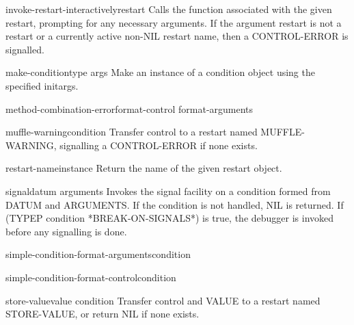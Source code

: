 \documentclass[10pt,english]{book}
\begin{document}
\begin{function}{invoke-restart-interactively}{restart}
  Calls the function associated with the given restart, prompting for any
   necessary arguments. If the argument restart is not a restart or a
   currently active non-NIL restart name, then a CONTROL-ERROR is signalled.
\end{function}

\begin{function}{make-condition}{type \rest args}
  Make an instance of a condition object using the specified initargs.
\end{function}

\begin{function}{method-combination-error}{format-control \rest format-arguments}
  
\end{function}

\begin{function}{muffle-warning}{\op condition}
  Transfer control to a restart named MUFFLE-WARNING, signalling a
   CONTROL-ERROR if none exists.
\end{function}

\begin{function}{restart-name}{instance}
  Return the name of the given restart object.
\end{function}

\begin{function}{signal}{datum \rest arguments}
  Invokes the signal facility on a condition formed from DATUM and
   ARGUMENTS. If the condition is not handled, NIL is returned. If
   (TYPEP condition *BREAK-ON-SIGNALS*) is true, the debugger is invoked
   before any signalling is done.
\end{function}

\begin{function}{simple-condition-format-arguments}{condition}
  
\end{function}

\begin{function}{simple-condition-format-control}{condition}
  
\end{function}

\begin{function}{store-value}{value \op condition}
  Transfer control and VALUE to a restart named STORE-VALUE, or return NIL if
   none exists.
\end{function}
\end{document}
